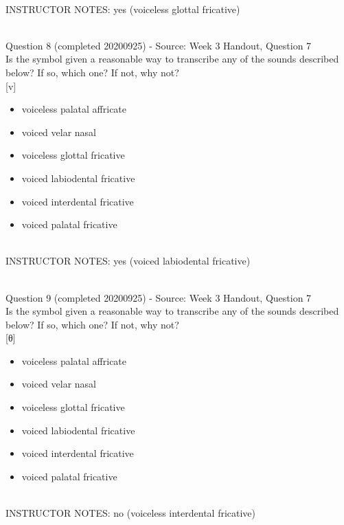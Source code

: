 \documentclass[12pt]{article}
\begin{document}
~\\
INSTRUCTOR NOTES: yes (voiceless glottal fricative)


~\\

{\large Question 8} (completed 20200925) - Source: Week 3 Handout, Question 7\\

Is the symbol given a reasonable way to transcribe any of the sounds described below? If so, which one? If not, why not?\\

{[v]}

\begin{itemize} \item voiceless palatal affricate \item voiced velar nasal \item voiceless glottal fricative \item voiced labiodental fricative \item voiced interdental fricative \item voiced palatal fricative \end{itemize}


~\\
INSTRUCTOR NOTES: yes (voiced labiodental fricative)


~\\

{\large Question 9} (completed 20200925) - Source: Week 3 Handout, Question 7\\

Is the symbol given a reasonable way to transcribe any of the sounds described below? If so, which one? If not, why not?\\

{[θ]}

\begin{itemize} \item voiceless palatal affricate \item voiced velar nasal \item voiceless glottal fricative \item voiced labiodental fricative \item voiced interdental fricative \item voiced palatal fricative \end{itemize}


~\\
INSTRUCTOR NOTES: no (voiceless interdental fricative)


~\\
\end{document}
